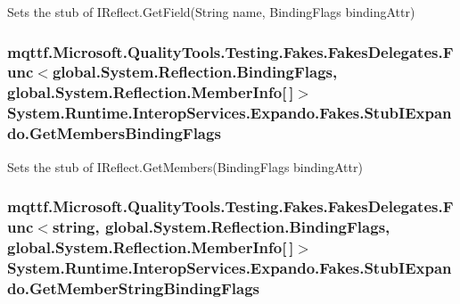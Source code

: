 Sets the stub of I\-Reflect.\-Get\-Field(\-String name, Binding\-Flags binding\-Attr)

\hypertarget{class_system_1_1_runtime_1_1_interop_services_1_1_expando_1_1_fakes_1_1_stub_i_expando_aaa19daeaa8f26e13c4dc3945c414e86f}{
\subsubsection[{Get\-Members\-Binding\-Flags}]{\setlength{\rightskip}{0pt plus 5cm}mqttf.\-Microsoft.\-Quality\-Tools.\-Testing.\-Fakes.\-Fakes\-Delegates.\-Func$<$global.\-System.\-Reflection.\-Binding\-Flags, global.\-System.\-Reflection.\-Member\-Info\mbox{[}$\,$\mbox{]}$>$ System.\-Runtime.\-Interop\-Services.\-Expando.\-Fakes.\-Stub\-I\-Expando.\-Get\-Members\-Binding\-Flags}}\label{class_system_1_1_runtime_1_1_interop_services_1_1_expando_1_1_fakes_1_1_stub_i_expando_aaa19daeaa8f26e13c4dc3945c414e86f}


Sets the stub of I\-Reflect.\-Get\-Members(\-Binding\-Flags binding\-Attr)

\hypertarget{class_system_1_1_runtime_1_1_interop_services_1_1_expando_1_1_fakes_1_1_stub_i_expando_a9a3c3ed22a5c5b0dc79c1477451c0566}{
\subsubsection[{Get\-Member\-String\-Binding\-Flags}]{\setlength{\rightskip}{0pt plus 5cm}mqttf.\-Microsoft.\-Quality\-Tools.\-Testing.\-Fakes.\-Fakes\-Delegates.\-Func$<$string, global.\-System.\-Reflection.\-Binding\-Flags, global.\-System.\-Reflection.\-Member\-Info\mbox{[}$\,$\mbox{]}$>$ System.\-Runtime.\-Interop\-Services.\-Expando.\-Fakes.\-Stub\-I\-Expando.\-Get\-Member\-String\-Binding\-Flags}}\label{class_system_1_1_runtime_1_1_interop_services_1_1_expando_1_1_fakes_1_1_stub_i_expando_a9a3c3ed22a5c5b0dc79c1477451c0566}



